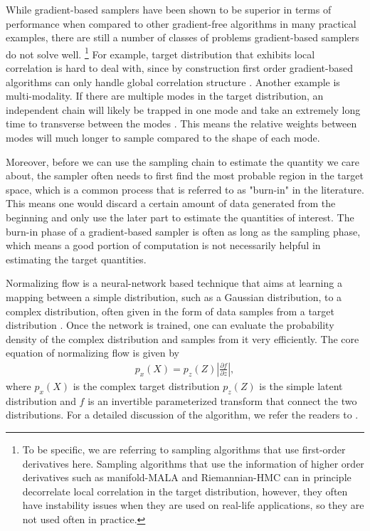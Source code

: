 \documentclass[twocolumn]{aastex631}
\begin{document}
While gradient-based samplers have been shown to be superior in terms of
performance when compared to other gradient-free algorithms in many practical
examples, there are still a number of classes of problems gradient-based
samplers do not solve well. \footnote{To be specific, we are referring to
sampling algorithms that use first-order derivatives here. Sampling algorithms
that use the information of higher order derivatives such as manifold-MALA and
Riemannian-HMC \cite{RMHMC} can in principle decorrelate local correlation in
the target distribution, however, they often have instability issues when they
are used on real-life applications, so they are not used often in practice.} For
example, target distribution that exhibits local correlation is hard to deal
with, since by construction first order gradient-based algorithms can only
handle global correlation structure \cite{2017arXiv170102434B}. Another example
is multi-modality. If there are multiple modes in the target distribution, an
independent chain will likely be trapped in one mode and take an extremely long
time to transverse between the modes \cite{2018arXiv180803230M}. This means the
relative weights between modes will much longer to sample compared to the shape
of each mode.

Moreover, before we can use the sampling chain to estimate the quantity we care about,
the sampler often needs to first find the most probable region in the target
space, which is a common process that is referred to as "burn-in" in the
literature. This means one would discard a certain amount of data generated from
the beginning and only use the later part to estimate the quantities of
interest. The burn-in phase of a gradient-based sampler is often as long as the
sampling phase, which means a good portion of computation is not necessarily
helpful in estimating the target quantities.

Normalizing flow is a neural-network based technique that aims at learning a
mapping between a simple distribution, such as a Gaussian distribution, to a
complex distribution, often given in the form of data samples from a target
distribution \cite{2019arXiv190809257K, 2019arXiv191202762P}. Once the network is trained, one can evaluate the probability
density of the complex distribution and samples from it very efficiently.
The core equation of normalizing flow is given by
\begin{align}
    p_x(X) = p_z(Z) \left| \frac{\partial f}{\partial z}\right|,
\end{align}
where $p_x(X)$ is the complex target distribution $p_z(Z)$ is the simple latent
distribution and $f$ is an invertible parameterized transform that
connect the two distributions. For a detailed discussion of the algorithm, we
refer the readers to \cite{2019arXiv190809257K, 2019arXiv191202762P}.
\end{document}
